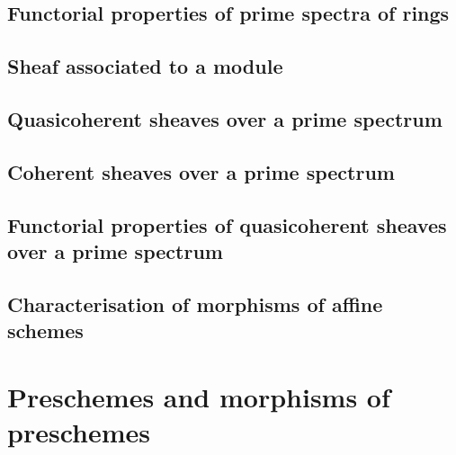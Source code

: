 \documentclass{book}
\begin{document}
       

        \subsection{Functorial properties of prime spectra of rings}

        

       

        \subsection{Sheaf associated to a module}

        

       

        \subsection{Quasicoherent sheaves over a prime spectrum}

        

      

        \subsection{Coherent sheaves over a prime spectrum}

        

       

        \subsection{Functorial properties of quasicoherent sheaves over a prime spectrum}

        

       

        \subsection{Characterisation of morphisms of affine schemes}

        



    \section{Preschemes and morphisms of preschemes}
\end{document}
